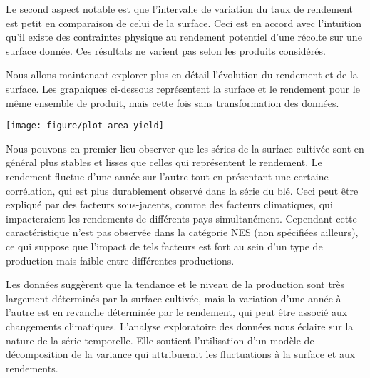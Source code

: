 \documentclass[nojss]{jss}\usepackage{graphicx, color}
\newenvironment{knitrout}{}{} %
\begin{document}
Le second aspect notable est que l'intervalle de variation du taux de
rendement est petit en comparaison de celui de la surface. Ceci est en
accord avec l'intuition qu'il existe des contraintes physique au
rendement potentiel d'une r\'{e}colte sur une surface donn\'{e}e. Ces
r\'{e}sultats ne varient pas selon les produits consid\'{e}r\'{e}s.


Nous allons maintenant explorer plus en d\'{e}tail l'\'{e}volution du
rendement et de la surface. Les graphiques ci-dessous repr\'{e}sentent
la surface et le rendement pour le m\^{e}me ensemble de produit, mais
cette fois sans transformation des donn\'{e}es.















\begin{knitrout}
\color{fgcolor}

{\centering \texttt{[image: figure/plot-area-yield]} 

}



\end{knitrout}


Nous pouvons en premier lieu observer que les s\'{e}ries de la surface
cultiv\'{e}e sont en g\'{e}n\'{e}ral plus stables et lisses que celles
qui repr\'{e}sentent le rendement. Le rendement fluctue d'une
ann\'{e}e sur l'autre tout en pr\'{e}sentant une certaine
corr\'{e}lation, qui est plus durablement observ\'{e} dans la
s\'{e}rie du bl\'{e}. Ceci peut \^{e}tre expliqu\'{e} par des facteurs
sous-jacents, comme des facteurs climatiques, qui impacteraient les
rendements de diff\'{e}rents pays simultan\'{e}ment. Cependant cette
caract\'{e}ristique n'est pas observ\'{e}e dans la cat\'{e}gorie NES
(non sp\'{e}cifi\'{e}es ailleurs), ce qui suppose que l'impact de tels
facteurs est fort au sein d'un type de production mais faible entre
diff\'{e}rentes productions.


Les donn\'{e}es sugg\`{e}rent que la tendance et le niveau de la
production sont tr\`{e}s largement d\'{e}termin\'{e}s par la surface
cultiv\'{e}e, mais la variation d'une ann\'{e}e \`{a} l'autre est en
revanche d\'{e}termin\'{e}e par le rendement, qui peut \^{e}tre
associ\'{e} aux changements climatiques. L'analyse exploratoire des
donn\'{e}es nous \'{e}claire sur la nature de la s\'{e}rie
temporelle. Elle soutient l'utilisation d'un mod\`{e}le de
d\'{e}composition de la variance qui attribuerait les fluctuations
\`{a} la surface et aux rendements.
\end{document}
